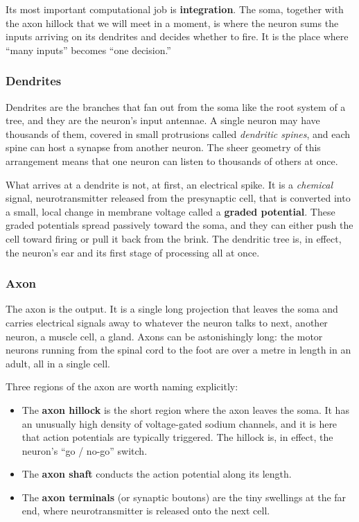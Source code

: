 \documentclass[11pt]{article}
\begin{document}
Its most important computational job is \textbf{integration}. The soma, together with the axon hillock that we will meet in a moment, is where the neuron sums the inputs arriving on its dendrites and decides whether to fire. It is the place where ``many inputs'' becomes ``one decision.''

\subsubsection{Dendrites}

Dendrites are the branches that fan out from the soma like the root system of a tree, and they are the neuron's input antennae. A single neuron may have thousands of them, covered in small protrusions called \textit{dendritic spines}, and each spine can host a synapse from another neuron. The sheer geometry of this arrangement means that one neuron can listen to thousands of others at once.

What arrives at a dendrite is not, at first, an electrical spike. It is a \textit{chemical} signal, neurotransmitter released from the presynaptic cell, that is converted into a small, local change in membrane voltage called a \textbf{graded potential}. These graded potentials spread passively toward the soma, and they can either push the cell toward firing or pull it back from the brink. The dendritic tree is, in effect, the neuron's ear and its first stage of processing all at once.

\subsubsection{Axon}

The axon is the output. It is a single long projection that leaves the soma and carries electrical signals away to whatever the neuron talks to next, another neuron, a muscle cell, a gland. Axons can be astonishingly long: the motor neurons running from the spinal cord to the foot are over a metre in length in an adult, all in a single cell.

Three regions of the axon are worth naming explicitly:

\begin{itemize}
    \item The \textbf{axon hillock} is the short region where the axon leaves the soma. It has an unusually high density of voltage-gated sodium channels, and it is here that action potentials are typically triggered. The hillock is, in effect, the neuron's ``go / no-go'' switch.
    \item The \textbf{axon shaft} conducts the action potential along its length.
    \item The \textbf{axon terminals} (or synaptic boutons) are the tiny swellings at the far end, where neurotransmitter is released onto the next cell.
\end{itemize}
\end{document}
